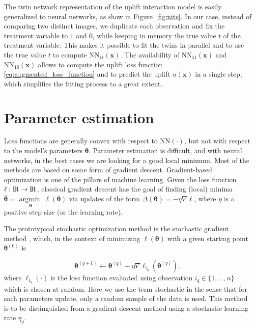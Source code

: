 \documentclass{article}
\def\x{\mathbf x}
\def \real{\rm I\!R}
\DeclareMathOperator*{\argmin}{argmin~} %
\begin{document}
The twin network  representation of the uplift interaction model is easily generalized to neural networks, as show in Figure~\ref{fig:nite}. In our case, instead of comparing two distinct images, we duplicate each observation and fix the treatment variable to $1$ and $0$, while keeping in memory the true value $t$ of the treatment variable. This makes it possible to fit the twins in parallel and to use the true value $t$ to compute $\mathrm{NN}_{1t}(\x)$. The availability of $\mathrm{NN}_{11}(\x)$ and $\mathrm{NN}_{10}(\x)$ allows to compute the uplift loss function \eqref{eq:augmented_loss_function} and to predict the uplift $u(\x)$ in a single step, which simplifies the fitting process to a great extent.




\section{Parameter estimation}

Loss functions are generally convex with respect to $\mathrm{NN}(\cdot)$, but not with respect to the model's parameters $\boldsymbol\theta$. Parameter estimation is difficult, and with neural networks, in the best cases we are looking for a good local minimum. Most of the methods are based on some form of gradient descent. Gradient-based optimization is one of the pillars of machine learning. Given the  loss function $\ell: \real \rightarrow \real$, classical gradient descent has the goal of finding (local) minima $\boldsymbol{\hat{\theta}} = \argmin\limits_{\boldsymbol{\theta}} \ell(\boldsymbol{\theta})$ via updates of the form $ \Delta (\boldsymbol{\theta}) =  -\eta \nabla \ell$, where $\eta$ is a positive step size (or the learning rate). %

The prototypical stochastic optimization method is the stochastic gradient
method \citep{robbins1951stochastic}, which, in the context of minimizing $\ell(\boldsymbol{\theta})$  with a given starting point  $\boldsymbol{\theta}^{(0)}$  is 

\begin{equation}
    \boldsymbol{\theta}^{(q+1)} \leftarrow \boldsymbol{\theta}^{(q)} - \eta \nabla \ell_{i_q} \left(\boldsymbol{\theta}^{(q)}\right),
\end{equation}
where $\ell_{i_q}(\cdot)$ is the loss function evaluated using observation $i_q\in \{1,...,n\}$ which is chosen at random. Here we use the term stochastic in the sense that for each parameters update, only a random sample of the data is used. This method is to be distinguished from a gradient descent method using a stochastic learning rate $\eta_q$. 
\end{document}
